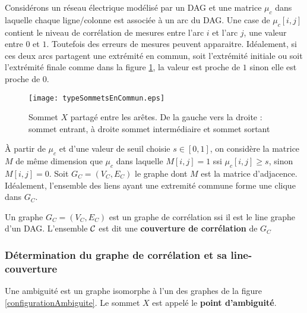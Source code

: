 Consid\'erons un r\'eseau \'electrique mod\'elis\'e  par un DAG et une matrice $\mu_c$ dans laquelle chaque ligne/colonne est associ\'ee \`a un arc du DAG.
Une case de $\mu_c[i,j]$ contient le niveau de corr\'elation de mesures entre l'arc $i$ et l'arc $j$, une valeur entre $0$ et $1$. Toutefois des erreurs de mesures peuvent apparaitre.
\newline
Id\'ealement, si ces deux arcs partagent une extr\'emit\'e en commun, soit l'extr\'emit\'e initiale ou soit l'extr\'emit\'e finale comme dans la figure \ref{typeSommetsEnCommun}, la valeur est proche de $1$ sinon elle est proche de $0$.
	\begin{centering}\vspace{-0.5em}
	\begin{figure}[htb!]\vspace{-0.5em}
	\texttt{[image: typeSommetsEnCommun.eps]}\vspace{-0.5em}
	\caption{ Sommet $X$ partag\'e entre les ar\^etes. De la gauche vers la droite : sommet entrant, \`a droite sommet interm\'ediaire et sommet sortant }\vspace{-0.5em}
	\label{typeSommetsEnCommun}
	\end{figure}
	\end{centering}
\`A partir de $\mu_c$ et d'une valeur de seuil choisie $s \in [0,1]$, on consid\`ere la matrice $M$ de m\^eme dimension que $\mu_{c}$ dans laquelle 
$M[i,j] = 1$ ssi $\mu_c[i,j] \ge s$, sinon $M[i,j] = 0$. 
\newline
Soit $G_C = (V_C,E_C)$ le graphe dont $M$ est la matrice d'adjacence.
Id\'ealement, l'ensemble des liens ayant une extremit\'e commune forme une clique dans $G_C$.

\begin{definition}
	Un graphe $G_C = (V_C, E_C)$ est un graphe de corr\'elation ssi il est le line graphe d'un DAG.
	L'ensemble $\cal C$ est dit une {\bf couverture de corr\'elation} de $G_C$
\end{definition}

\subsubsection{D\'etermination du graphe de corr\'elation et sa line-couverture}
	\begin{definition}
	Une ambiguit\'e est un graphe isomorphe \`a l'un des graphes de la figure \ref{configurationAmbiguite}. Le sommet $X$ est appel\'e le {\bf point d'ambiguit\'e}.
	\end{definition}
	
